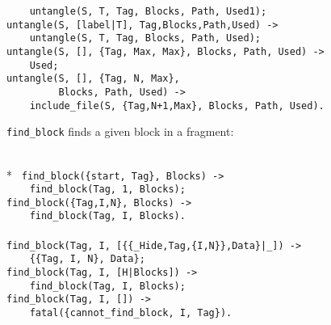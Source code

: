 \begin{flushleft}
\verb&    untangle(S, T, Tag, Blocks, Path, Used1);&\\
\noindent{}%
\verb&untangle(S, [label|T], Tag,Blocks,Path,Used) ->&\\
\noindent{}%
\verb&    untangle(S, T, Tag, Blocks, Path, Used);&\\
\noindent{}%
\verb&untangle(S, [], {Tag, Max, Max}, Blocks, Path, Used) ->&\\
\noindent{}%
\verb&    Used;&\\
\noindent{}%
\verb&untangle(S, [], {Tag, N, Max},&\\
\noindent{}%
\verb&         Blocks, Path, Used) ->&\\
\noindent{}%
\verb&    include_file(S, {Tag,N+1,Max}, Blocks, Path, Used).&\\
\end{flushleft}

\verb+find_block+ finds a given block in a fragment:

\begin{flushleft}
\label{eweave_14_14}
\\*
\tt
\noindent{}%
\verb&find_block({start, Tag}, Blocks) ->&\\
\noindent{}%
\verb&    find_block(Tag, 1, Blocks);&\\
\noindent{}%
\verb&find_block({Tag,I,N}, Blocks) ->&\\
\noindent{}%
\verb&    find_block(Tag, I, Blocks).&\\
\noindent{}%
\verb&&\\
\noindent{}%
\verb&find_block(Tag, I, [{{_Hide,Tag,{I,N}},Data}|_]) ->&\\
\noindent{}%
\verb&    {{Tag, I, N}, Data};&\\
\noindent{}%
\verb&find_block(Tag, I, [H|Blocks]) ->&\\
\noindent{}%
\verb&    find_block(Tag, I, Blocks);&\\
\noindent{}%
\verb&find_block(Tag, I, []) ->&\\
\noindent{}%
\verb&    fatal({cannot_find_block, I, Tag}).&\\
\end{flushleft}

